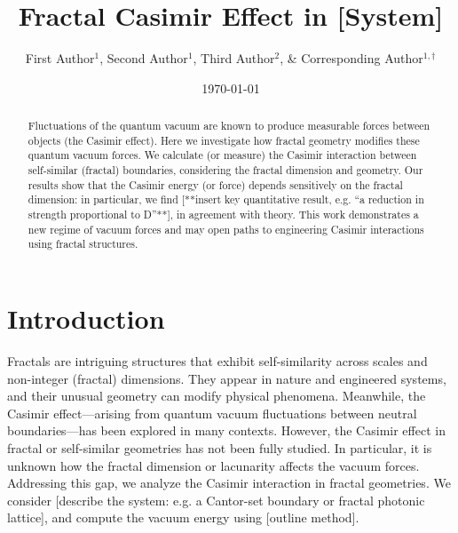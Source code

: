 \documentclass[aps,prl,10pt]{revtex4-1} %
\begin{document}
\title{Fractal Casimir Effect in [System]} %
\author{First Author$^{1}$, Second Author$^{1}$, Third Author$^{2}$, \& Corresponding Author$^{1,\dagger}$}
\date{\today}

\begin{abstract}
Fluctuations of the quantum vacuum are known to produce measurable forces between objects (the Casimir effect).  Here we investigate how fractal geometry modifies these quantum vacuum forces.  We calculate (or measure) the Casimir interaction between self-similar (fractal) boundaries, considering the fractal dimension and geometry.  Our results show that the Casimir energy (or force) depends sensitively on the fractal dimension: in particular, we find [**insert key quantitative result, e.g. “a reduction in strength proportional to D”**], in agreement with theory.  This work demonstrates a new regime of vacuum forces and may open paths to engineering Casimir interactions using fractal structures.
\end{abstract}

\maketitle

\section*{Introduction}
Fractals are intriguing structures that exhibit self-similarity across scales and non-integer (fractal) dimensions.  They appear in nature and engineered systems, and their unusual geometry can modify physical phenomena.  Meanwhile, the Casimir effect—arising from quantum vacuum fluctuations between neutral boundaries—has been explored in many contexts.  However, the Casimir effect in fractal or self-similar geometries has not been fully studied.  In particular, it is unknown how the fractal dimension or lacunarity affects the vacuum forces.  Addressing this gap, we analyze the Casimir interaction in fractal geometries.  We consider [describe the system: e.g. a Cantor-set boundary or fractal photonic lattice], and compute the vacuum energy using [outline method].  
\end{document}
